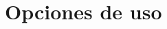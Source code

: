 \documentclass[informe.tex]{subfiles}
\begin{document}
  
  \section{Opciones de uso}
\end{document}
